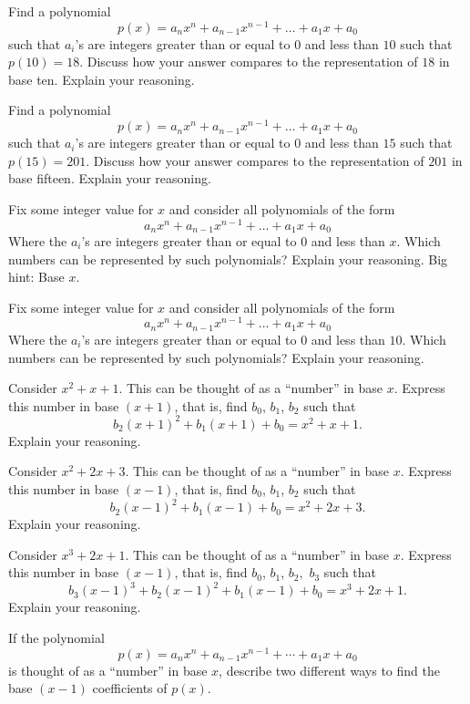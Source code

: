 \documentclass[nooutcomes]{ximera}
\begin{document}
\begin{problem}Find a polynomial 
\[
p(x) = a_nx^n + a_{n-1}x^{n-1} + \dots + a_1 x+ a_0
\]
such that $a_i$'s are integers greater than or equal to $0$ and less
than $10$ such that $p(10) = 18$. Discuss how your answer compares to
the representation of $18$ in base ten. Explain your reasoning.
\end{problem} 

\begin{problem}Find a polynomial 
\[
p(x) = a_nx^n + a_{n-1}x^{n-1} + \dots + a_1 x+ a_0
\]
such that $a_i$'s are integers greater than or equal to $0$ and less
than $15$ such that $p(15) = 201$. Discuss how your answer compares to
the representation of $201$ in base fifteen. Explain your reasoning.
\end{problem} 

\begin{problem}Fix some integer value for $x$ and consider all polynomials of the form
\[
a_nx^n + a_{n-1}x^{n-1} + \dots + a_1 x+ a_0
\]
Where the $a_i$'s are integers greater than or equal to $0$ and less
than $x$. Which numbers can be represented by such polynomials?
Explain your reasoning. Big hint: Base $x$.
\end{problem} 

\begin{problem}Fix some integer value for $x$ and consider all polynomials of
  the form
\[
a_nx^n + a_{n-1}x^{n-1} + \dots + a_1 x+ a_0
\]
Where the $a_i$'s are integers greater than or equal to $0$ and less
than $10$. Which numbers can be represented by such polynomials?
Explain your reasoning.
\end{problem} 

\begin{problem}Consider $x^2 + x + 1$. This can be thought of as a ``number'' in
  base $x$. Express this number in base $(x+1)$, that is, find $b_0$, $b_1$, $b_2$ such that 
\[
b_2(x+1)^2 +b_1(x+1) + b_0 = x^2 + x + 1.
\]
Explain your reasoning.
\end{problem} 

\begin{problem}Consider $x^2 + 2x + 3$. This can be thought of as a ``number'' in
  base $x$. Express this number in base $(x-1)$, that is, find $b_0$, $b_1$, $b_2$ such that 
\[
b_2(x-1)^2 +b_1(x-1) + b_0 = x^2 + 2x + 3.
\]
Explain your reasoning.
\end{problem} 

\begin{problem}Consider $x^3 + 2x + 1$. This can be thought of as a ``number'' in
  base $x$. Express this number in base $(x-1)$, that is, find $b_0$, $b_1$, $b_2,$ $b_3$ such that 
\[
b_3(x-1)^3 + b_2(x-1)^2 +b_1(x-1) + b_0 = x^3 + 2x + 1.
\]
Explain your reasoning.
\end{problem} 

\begin{problem}If the polynomial
\[
p(x) = a_nx^n + a_{n-1}x^{n-1} + \cdots + a_1x + a_0
\]
is thought of as a ``number'' in base $x$, describe two different ways
to find the base $(x-1)$ coefficients of $p(x)$.
\end{problem}
\end{document}
